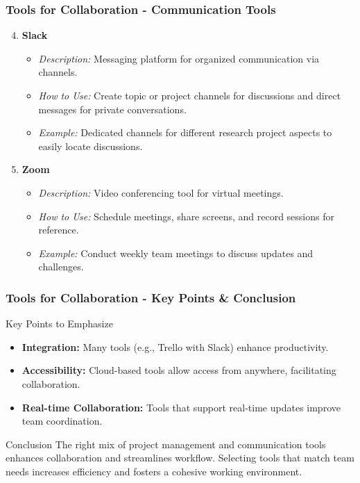 \documentclass[aspectratio=169]{beamer}
\begin{document}
\begin{frame}[fragile]
    \frametitle{Tools for Collaboration - Communication Tools}
    \begin{enumerate}
        \setcounter{enumi}{3}
        \item \textbf{Slack}
        \begin{itemize}
            \item \textit{Description:} Messaging platform for organized communication via channels.
            \item \textit{How to Use:} Create topic or project channels for discussions and direct messages for private conversations.
            \item \textit{Example:} Dedicated channels for different research project aspects to easily locate discussions.
        \end{itemize}

        \item \textbf{Zoom}
        \begin{itemize}
            \item \textit{Description:} Video conferencing tool for virtual meetings.
            \item \textit{How to Use:} Schedule meetings, share screens, and record sessions for reference.
            \item \textit{Example:} Conduct weekly team meetings to discuss updates and challenges.
        \end{itemize}
    \end{enumerate}
\end{frame}

\begin{frame}[fragile]
    \frametitle{Tools for Collaboration - Key Points & Conclusion}
    \begin{block}{Key Points to Emphasize}
        \begin{itemize}
            \item \textbf{Integration:} Many tools (e.g., Trello with Slack) enhance productivity.
            \item \textbf{Accessibility:} Cloud-based tools allow access from anywhere, facilitating collaboration.
            \item \textbf{Real-time Collaboration:} Tools that support real-time updates improve team coordination.
        \end{itemize}
    \end{block}
    
    \begin{block}{Conclusion}
        The right mix of project management and communication tools enhances collaboration and streamlines workflow. Selecting tools that match team needs increases efficiency and fosters a cohesive working environment.
    \end{block}
\end{frame}
\end{document}
